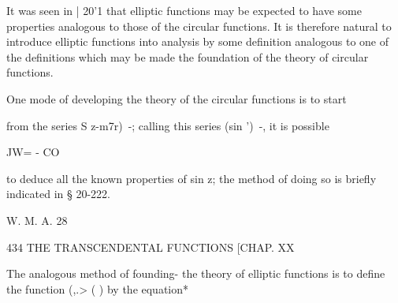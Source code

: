It was seen in | 20'1 that elliptic functions may be expected to have
some properties analogous to those of the circular functions. It is
therefore natural to introduce elliptic functions into analysis by
some definition analogous to one of the definitions which may be made
the foundation of the theory of circular functions.

One mode of developing the theory of the circular functions is to
start

from the series S z-m7r)~-; calling this series (sin ')~-, it is
possible

JW= - CO

to deduce all the known properties of sin z; the method of doing so
is briefly indicated in § 20-222.

W. M. A. 28

434 THE TRANSCENDENTAL FUNCTIONS [CHAP. XX

The analogous method of founding- the theory of elliptic functions is
to define the function (,.> ( ) by the equation*

